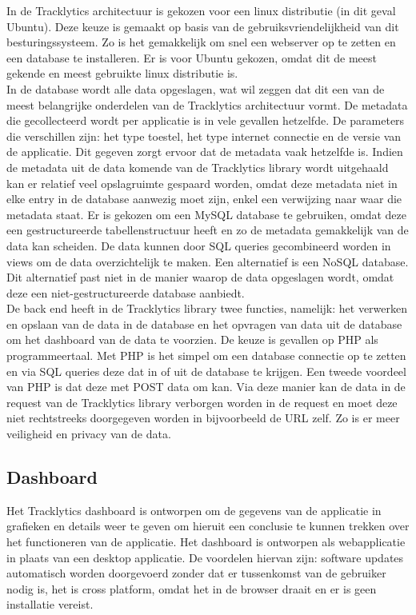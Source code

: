 In de Tracklytics architectuur is gekozen voor een linux distributie (in dit geval Ubuntu). Deze keuze is gemaakt op basis van de gebruiksvriendelijkheid van dit besturingssysteem. Zo is het gemakkelijk om snel een webserver op te zetten en een database te installeren. Er is voor Ubuntu gekozen, omdat dit de meest gekende en meest gebruikte linux distributie is. \\

In de database wordt alle data opgeslagen, wat wil zeggen dat dit een van de meest belangrijke onderdelen van de Tracklytics architectuur vormt. De metadata die gecollecteerd wordt per applicatie is in vele gevallen hetzelfde. De parameters die verschillen zijn: het type toestel, het type internet connectie en de versie van de applicatie. Dit gegeven zorgt ervoor dat de metadata vaak hetzelfde is. Indien de metadata uit de data komende van de Tracklytics library wordt uitgehaald kan er relatief veel opslagruimte gespaard worden, omdat deze metadata niet in elke entry in de database aanwezig moet zijn, enkel een verwijzing naar waar die metadata staat. Er is gekozen om een MySQL database te gebruiken, omdat deze een gestructureerde tabellenstructuur heeft en zo de metadata gemakkelijk van de data kan scheiden. De data kunnen door SQL queries gecombineerd worden in views om de data overzichtelijk te maken. Een alternatief is een NoSQL database. Dit alternatief past niet in de manier waarop de data opgeslagen wordt, omdat deze een niet-gestructureerde database aanbiedt. \\

De back end heeft in de Tracklytics library twee functies, namelijk: het verwerken en opslaan van de data in de database en het opvragen van data uit de database om het dashboard van de data te voorzien. De keuze is gevallen op PHP als programmeertaal. Met PHP is het simpel om een database connectie op te zetten en via SQL queries deze dat in of uit de database te krijgen. Een tweede voordeel van PHP is dat deze met POST data om kan. Via deze manier kan de data in de request van de Tracklytics library verborgen worden in de request en moet deze niet rechtstreeks doorgegeven worden in bijvoorbeeld de URL zelf. Zo is er meer veiligheid en privacy van de data. \\


\subsection{Dashboard}\label{visualisatie}
Het Tracklytics dashboard is ontworpen om de gegevens van de applicatie in grafieken en details weer te geven om hieruit een conclusie te kunnen trekken over het functioneren van de applicatie. Het dashboard is ontworpen als webapplicatie in plaats van een desktop applicatie. De voordelen hiervan zijn: software updates automatisch worden doorgevoerd zonder dat er tussenkomst van de gebruiker nodig is, het is cross platform, omdat het in de browser draait en er is geen installatie vereist. \\

